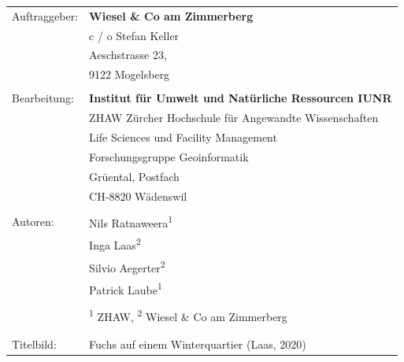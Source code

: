 \documentclass[
]{scrbook}
\begin{document}
\begin{titlepage}
\begin{flushleft}
\begin{minipage}{21cm}
\begin{tabular}{ll}
Auftraggeber: & \textbf{Wiesel \& Co am Zimmerberg}                         \\
              & c / o Stefan Keller                                         \\
              & Aeschstrasse 23,                                            \\
              & 9122 Mogelsberg                                             \\
              &                                                             \\
Bearbeitung:  & \textbf{Institut für Umwelt und Natürliche Ressourcen IUNR} \\
              & ZHAW Zürcher Hochschule für Angewandte Wissenschaften       \\
              & Life Sciences und Facility Management                       \\
              & Forschungsgruppe Geoinformatik                              \\
              & Grüental, Postfach                                          \\
              & CH-8820 Wädenswil                                           \\
              &                                                             \\
Autoren:      & Nils Ratnaweera\textsuperscript{1}                         \\
              & Inga Laas\textsuperscript{2}                              \\
              & Silvio Aegerter\textsuperscript{2}                        \\
              & Patrick Laube\textsuperscript{1}                           \\
              &                                                             \\
              & \textsuperscript{1} ZHAW, \textsuperscript{2} Wiesel \& Co am Zimmerberg \\
              &                                                             \\
              &                                                             \\
Titelbild:    & Fuchs auf einem Winterquartier (Laas, 2020)                
\end{tabular}
\end{minipage}


\end{flushleft}

\end{titlepage}
\makeatother
\end{document}
